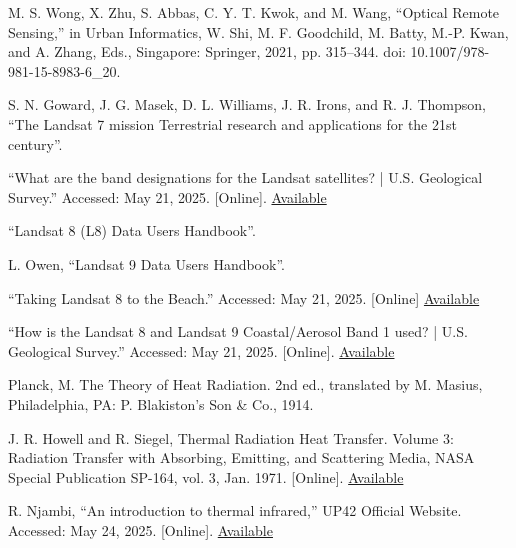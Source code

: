 \documentclass{article}
\begin{document}
{\begin{enumerate}
    \item{M. S. Wong, X. Zhu, S. Abbas, C. Y. T. Kwok, and M. Wang, “Optical Remote Sensing,” in Urban Informatics, W. Shi, M. F. Goodchild, M. Batty, M.-P. Kwan, and A. Zhang, Eds., Singapore: Springer, 2021, pp. 315–344. doi: 10.1007/978-981-15-8983-6_20.}

    \item{S. N. Goward, J. G. Masek, D. L. Williams, J. R. Irons, and R. J. Thompson, “The Landsat 7 mission Terrestrial research and applications for the 21st century”.}

    \item{“What are the band designations for the Landsat satellites? | U.S. Geological Survey.” Accessed: May 21, 2025. [Online]. \href{https://www.usgs.gov/faqs/what-are-band-designations-landsat-satellites}{Available}}

    \item{“Landsat 8 (L8) Data Users Handbook”.}

    \item{L. Owen, “Landsat 9 Data Users Handbook”.}

    \item{“Taking Landsat 8 to the Beach.” Accessed: May 21, 2025. [Online] \href{https://earthobservatory.nasa.gov/images/84218/taking-landsat-8-to-the-beach}{Available}}

    \item{“How is the Landsat 8 and Landsat 9 Coastal/Aerosol Band 1 used? | U.S. Geological Survey.” Accessed: May 21, 2025. [Online]. \href{https://www.usgs.gov/faqs/how-landsat-8-and-landsat-9-coastalaerosol-band-1-used}{Available}}

    \item{Planck, M. The Theory of Heat Radiation. 2nd ed., translated by M. Masius, Philadelphia, PA: P. Blakiston's Son & Co., 1914.}

    \item{J. R. Howell and R. Siegel, Thermal Radiation Heat Transfer. Volume 3: Radiation Transfer with Absorbing, Emitting, and Scattering Media, NASA Special Publication SP-164, vol. 3, Jan. 1971. [Online]. \href{https://ntrs.nasa.gov/api/citations/19710021465/downloads/19710021465.pdf}{Available}

    \item{R. Njambi, “An introduction to thermal infrared,” UP42 Official Website. Accessed: May 24, 2025. [Online]. \href{https://up42.com/blog/introduction-to-thermal-infrared}{Available}}

}
\end{enumerate}}
\end{document}

